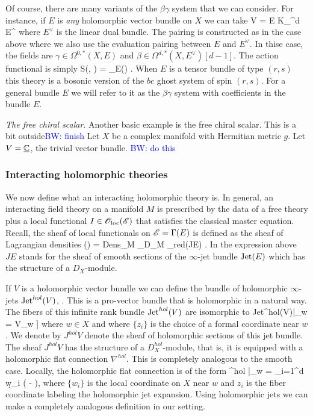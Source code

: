 \documentclass[10pt]{amsart}
\def\brian{\textcolor{blue}{BW: }\textcolor{blue}}
\begin{document}
Of course, there are many variants of the $\beta\gamma$ system that we can consider.
For instance, if $E$ is {\em any} holomorphic vector bundle on $X$ we can take 
\ben
V = E \oplus K_{\CC^d} \tensor E^\vee
\een
where $E^\vee$ is the linear dual bundle. 
The pairing is constructed as in the case above where we also use the evaluation pairing between $E$ and $E^\vee$.
In thise case, the fields are $\gamma \in \Omega^{0,*}(X, E)$ and $\beta \in \Omega^{d,*}(X, E^\vee)[d-1]$. 
The action functional is simply
\ben
S(\gamma, \beta) = _E(\beta \wedge \dbar \gamma) .
\een
When $E$ is a tensor bundle of type $(r,s)$ this theory is a bosonic version of the $bc$ ghost system of spin $(r,s)$. 
For a general bundle $E$ we will refer to it as the $\beta\gamma$ system with coefficients in the bundle $E$. 

\begin{eg}
{\em The free chiral scalar}.
Another basic example is the free chiral scalar. 
This is a bit outside\brian{finish}
Let $X$ be a complex manifold with Hermitian metric $g$. 
Let $V = \underline{\mathbb C}$, the trivial vector bundle. 
\brian{do this}
\end{eg}

\subsubsection{Interacting holomorphic theories}

\def\olochol{\sO_{\rm loc}^{hol}}

We now define what an interacting holomorphic theory is.
In general, an interacting field theory on a manifold $M$ is prescribed by the data of a free theory plus a local functional $I \in {\mathscr O}_{\rm loc}(\mathscr E)$ that satisfies the classical master equation. 
Recall, the sheaf of local functionals on $\mathscr E = \Gamma(E)$ is defined as the sheaf of Lagrangian densities
\ben
\oloc(\sE) = {\rm Dens}_M \tensor_{D_M} \sO_{red}(JE) .
\een
In the expression above $JE$ stands for the sheaf of smooth sections of the $\infty$-jet bundle ${\rm Jet}(E)$ which has the structure of a $D_X$-module.

If $V$ is a holomorphic vector bundle we can define the bundle of holomorphic $\infty$-jets ${\rm Jet}^{hol}(V)$, \cite{GriffithsGreen, Wong}. 
This is a pro-vector bundle that is holomorphic in a natural way.
The fibers of this infinite rank bundle ${\rm Jet}^{hol}(V)$ are isomorphic to 
\ben
{\rm Jet}^{hol}(V)|_w = V_w \tensor \CC[[z_1,\ldots,z_d]] 
\een
where $w \in X$ and where $\{z_i\}$ is the choice of a formal coordinate near $w$. 
We denote by $J^{hol} V$ denote the sheaf of holomorphic sections of this jet bundle.
The sheaf $J^{hol}V$ has the structure of a $D_X^{hol}$-module, that is, it is equipped with a holomorphic flat connection $\nabla^{hol}$.
This is completely analogous to the smooth case.
Locally, the holomorphic flat connection is of the form
\ben
\nabla^{hol} |_w = \sum_{i=1}^d \d w_i \left( - \right),
\een
where $\{w_i\}$ is the local coordinate on $X$ near $w$ and $z_i$ is the fiber coordinate labeling the holomorphic jet expansion.
Using holomorphic jets we can make a completely analogous definition in our setting.
\end{document}

